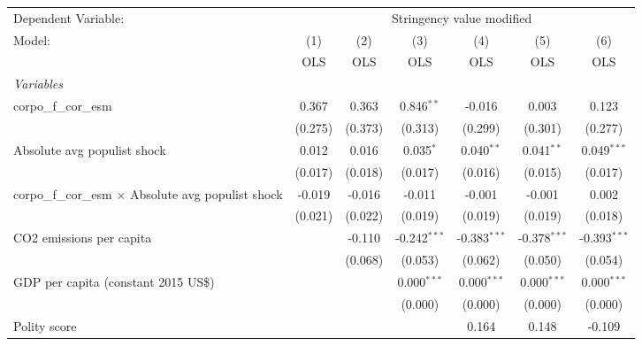 
\begingroup
\centering
\begin{tabular}{lcccccc}
   \toprule
   Dependent Variable: & \multicolumn{6}{c}{Stringency value modified}\\
   Model:                                                      & (1)     & (2)     & (3)            & (4)            & (5)            & (6)\\  
                                                               &  OLS    & OLS     & OLS            & OLS            & OLS            & OLS\\  
   \midrule
   \emph{Variables}\\
   corpo\_f\_cor\_esm                                          & 0.367   & 0.363   & 0.846$^{**}$   & -0.016         & 0.003          & 0.123\\   
                                                               & (0.275) & (0.373) & (0.313)        & (0.299)        & (0.301)        & (0.277)\\   
   Absolute avg populist shock                                 & 0.012   & 0.016   & 0.035$^{*}$    & 0.040$^{**}$   & 0.041$^{**}$   & 0.049$^{***}$\\   
                                                               & (0.017) & (0.018) & (0.017)        & (0.016)        & (0.015)        & (0.017)\\   
   corpo\_f\_cor\_esm $\times$ Absolute avg populist shock     & -0.019  & -0.016  & -0.011         & -0.001         & -0.001         & 0.002\\   
                                                               & (0.021) & (0.022) & (0.019)        & (0.019)        & (0.019)        & (0.018)\\   
   CO2 emissions per capita                                    &         & -0.110  & -0.242$^{***}$ & -0.383$^{***}$ & -0.378$^{***}$ & -0.393$^{***}$\\   
                                                               &         & (0.068) & (0.053)        & (0.062)        & (0.050)        & (0.054)\\   
   GDP per capita (constant 2015 US\$)                         &         &         & 0.000$^{***}$  & 0.000$^{***}$  & 0.000$^{***}$  & 0.000$^{***}$\\   
                                                               &         &         & (0.000)        & (0.000)        & (0.000)        & (0.000)\\   
   Polity score                                                &         &         &                & 0.164          & 0.148          & -0.109\\   

\end{tabular}
